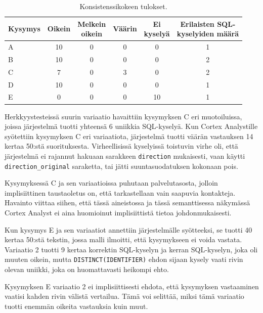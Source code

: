 \renewcommand{\arraystretch}{1.1}
\begin{table}[h]
  \centering
  \caption{Konsistenssikokeen tulokset.}
  \label{tb:consistency}
  \setlength{\tabcolsep}{4pt}
  {\small
    \begin{tabular}{lccccc}
      \toprule
      Kysymys & Oikein & \makecell{Melkein\\oikein} & Väärin & \makecell{Ei\\kyselyä} &
      \makecell{Erilaisten SQL-\\kyselyiden määrä} \\
      \midrule
      A & 10 & 0 & 0 & 0 & 1 \\
      B & 10 & 0 & 0 & 0 & 2 \\
      C & 7  & 0 & 3 & 0 & 2 \\
      D & 10 & 0 & 0 & 0  & 1 \\
      E & 0  & 0 & 0 & 10 & 1 \\
      \bottomrule
    \end{tabular}
  }
\end{table}

Herkkyystesteissä suurin variaatio havaittiin kysymyksen C eri muotoiluissa, joissa järjestelmä tuotti yhteensä 6 uniikkia SQL-kyselyä. Kun Cortex Analystille syötettiin kysymyksen C eri variaatiota, järjestelmä tuotti väärän vastauksen 14 kertaa 50:stä suorituksesta. Virheellisissä kyselyissä toistuvin virhe oli, että järjestelmä ei rajannut hakuaan sarakkeen \texttt{direction} mukaisesti, vaan käytti \texttt{direction\_original} saraketta, tai jätti suuntasuodatuksen kokonaan pois.

Kysymyksessä C ja sen variaatioissa puhutaan palvelutasosta, jolloin implisiittinen taustaoletus on, että tarkastellaan vain saapuvia kontakteja. Havainto viittaa siihen, että tässä aineistossa ja tässä semanttisessa näkymässä Cortex Analyst ei aina huomioinut implisiittistä tietoa johdonmukaisesti.

Kun kysymys E ja sen variaatiot annettiin järjestelmälle syötteeksi, se tuotti 40 kertaa 50:stä tekstin, jossa malli ilmoitti, että kysymykseen ei voida vastata. Variaatio 2 tuotti 9 kertaa korrektin SQL-kyselyn ja kerran SQL-kyselyn, joka oli muuten oikein, mutta \texttt{DISTINCT(IDENTIFIER)} ehdon sijaan kysely vaati rivin olevan uniikki, joka on huomattavasti heikompi ehto.

Kysymyksen E variaatio 2 ei implisiittisesti ehdota, että kysymyksen vastaaminen vaatisi kahden rivin välistä vertailua. Tämä voi selittää, miksi tämä variaatio tuotti enemmän oikeita vastauksia kuin muut.

